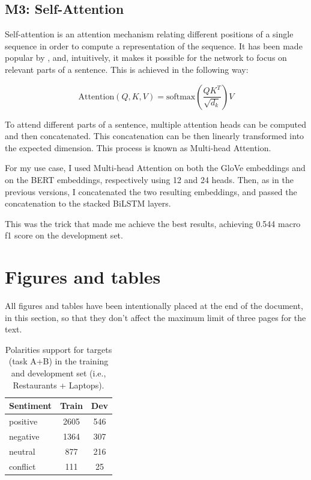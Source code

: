 \documentclass[11pt,a4paper]{article}
\begin{document}
	\subsection{M3: Self-Attention}
	Self-attention is an attention mechanism relating different positions
	of a single sequence in order to compute a representation of the sequence. It has been made popular by \citep{vaswani2017attention}, and, intuitively, it makes it possible for the network to focus on relevant parts of a sentence. This is achieved in the following way:
	
	\begin{equation}
		\mathrm{Attention}(Q, K, V) = \mathrm{softmax}(\frac{QK^T}{\sqrt{d_k}})V
	\end{equation}
	
	To attend different parts of a sentence, multiple attention heads can be computed and then concatenated. This concatenation can be then linearly transformed into the expected dimension. This process is known as Multi-head Attention.
	
	For my use case, I used Multi-head Attention on both the GloVe embeddings and on the BERT embeddings, respectively using 12 and 24 heads. Then, as in the previous versions, I concatenated the two resulting embeddings, and passed the concatenation to the stacked BiLSTM layers.
	
	This was the trick that made me achieve the best results, achieving 0.544 macro f1 score on the development set.
	
	\clearpage
	\section{Figures and tables}
	All figures and tables have been intentionally placed at the end of the document, in this section, so that they don't affect the maximum limit of three pages for the text.
	
	\begin{table}[H]
		\centering
		\begin{tabular}{@{}lcc@{}}
			\toprule
			\textbf{Sentiment} & Train & Dev \\ \midrule
			positive           & 2605  & 546 \\
			negative           & 1364  & 307 \\
			neutral            & 877   & 216 \\
			conflict           & 111   & 25  \\ \bottomrule
		\end{tabular}
		\caption{Polarities support for targets (task A+B) in the training and development set (i.e., Restaurants + Laptops).}
		\label{tab:my-table}
	\end{table}
	
\end{document}
